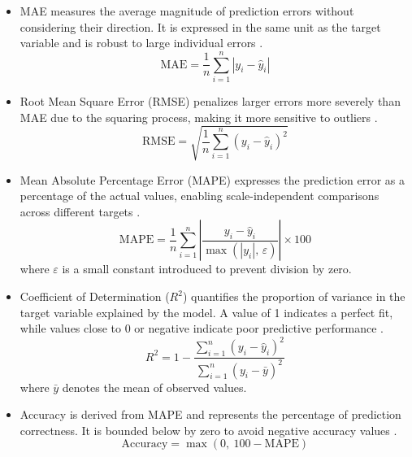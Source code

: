 \documentclass[final, 9pt, twocolumn]{saucis}
\begin{document}
\begin{itemize}
    \item MAE measures the average 
    magnitude of prediction errors without considering their direction. It is expressed in the same unit as the target variable and is robust to large individual errors \cite{method19}.
    \begin{equation}
        \text{MAE} = \frac{1}{n} \sum_{i=1}^{n} \left| y_i - \hat{y}_i \right|
    \end{equation}

    \item Root Mean Square Error (RMSE) penalizes larger errors more severely than MAE due to the squaring process, making it more sensitive to outliers \cite{method19}.
    \begin{equation}
        \text{RMSE} = \sqrt{\frac{1}{n} \sum_{i=1}^{n} \left( y_i - \hat{y}_i \right)^{2}}
    \end{equation}

    \item Mean Absolute Percentage Error (MAPE) expresses 
    the prediction error as a percentage of the actual values, enabling 
    scale-independent comparisons across different targets \cite{method19}.
    \begin{equation}
        \text{MAPE} = \frac{1}{n} \sum_{i=1}^{n} 
        \left| \frac{y_i - \hat{y}_i}{\max\left(|y_i|,\, \varepsilon\right)} \right| \times 100
    \end{equation}
    where $\varepsilon$ is a small constant introduced to prevent 
    division by zero.

    \item Coefficient of Determination ($R^{2}$) quantifies 
    the proportion of variance in the target variable explained by the model. A value of 1 indicates a perfect fit, while values close to 0 or negative indicate poor predictive performance 
    \cite{method19}.
    \begin{equation}
        R^{2} = 1 - \frac{\sum_{i=1}^{n}(y_i - \hat{y}_i)^{2}}
        {\sum_{i=1}^{n}(y_i - \bar{y})^{2}}
    \end{equation}
    where $\bar{y}$ denotes the mean of observed values.

    \item Accuracy is derived from MAPE and represents the 
    percentage of prediction correctness. It is bounded below 
    by zero to avoid negative accuracy values \cite{method19}.
    \begin{equation}
        \text{Accuracy} = \max(0,\ 100 - \text{MAPE})
    \end{equation}
\end{itemize}
\end{document}
